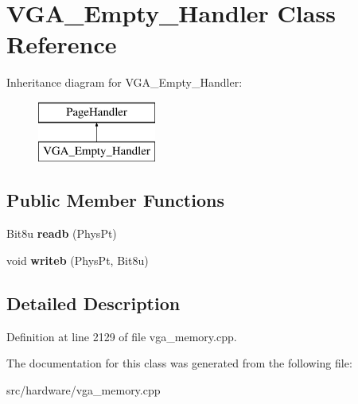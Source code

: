\hypertarget{classVGA__Empty__Handler}{\section{V\-G\-A\-\_\-\-Empty\-\_\-\-Handler Class Reference}
\label{classVGA__Empty__Handler}
}
Inheritance diagram for V\-G\-A\-\_\-\-Empty\-\_\-\-Handler\-:\begin{figure}[H]
\begin{center}
\leavevmode
\includegraphics[height=2.000000cm]{classVGA__Empty__Handler}
\end{center}
\end{figure}
\subsection*{Public Member Functions}
\begin{DoxyCompactItemize}
\item 
\hypertarget{classVGA__Empty__Handler_a24a79290a9c8f8f1c82b5f5c15dbb59f}{Bit8u {\bfseries readb} (Phys\-Pt)}\label{classVGA__Empty__Handler_a24a79290a9c8f8f1c82b5f5c15dbb59f}

\item 
\hypertarget{classVGA__Empty__Handler_a2e5f70a97bcb92d068b65e7d47138dd7}{void {\bfseries writeb} (Phys\-Pt, Bit8u)}\label{classVGA__Empty__Handler_a2e5f70a97bcb92d068b65e7d47138dd7}

\end{DoxyCompactItemize}


\subsection{Detailed Description}


Definition at line 2129 of file vga\-\_\-memory.\-cpp.



The documentation for this class was generated from the following file\-:\begin{DoxyCompactItemize}
\item 
src/hardware/vga\-\_\-memory.\-cpp\end{DoxyCompactItemize}
